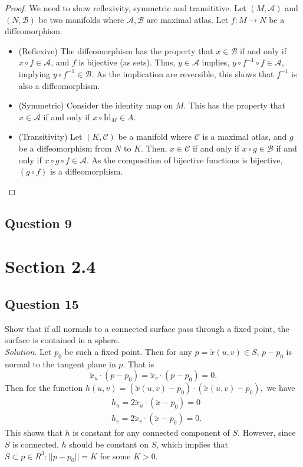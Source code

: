 \documentclass[12pt]{article}
\begin{document}
\begin{proof}
    We need to show reflexivity, symmetric and transititive.
    Let $(M, \mathscr A)$ and $(N, \mathscr B)$ be two manifolds where $\mathscr A, \mathscr B$ are
    maximal atlas. Let $f: M \to N$ be a diffeomorphism.
    \begin{itemize}
        \item (Reflexive) The diffeomorphism has the property
        that $x \in \mathscr B$ if and only if $x \circ f \in \mathscr A$,
        and $f$ is bijective (as sets). Thus, $y \in \mathscr A$ implies, $y \circ f^{-1} \circ f \in \mathscr A$,
        implying $y \circ f^{-1} \in \mathscr B$. As the implication are reversible,
        this shows that $f^{-1}$ is also a diffeomorphism.
        \item (Symmetric) Consider the identity map on $M$. This has the property
        that $x \in \mathscr A$ if and only if $x \circ \mathrm{Id}_M \in A$.
        \item (Transitivity) Let $(K, \mathscr C)$ be a manifold where $\mathscr C$ is a maximal atlas,
        and $g$ be a diffeomorphism from $N$ to $K$.
        Then, $x \in \mathscr C$ if and only if $x \circ g \in \mathscr B$ if and only if $x \circ g \circ f \in \mathscr A.$
        As the composition of bijective functions is bijective, $(g \circ f)$ is a diffeomorphism.
    \end{itemize} 
\end{proof}

\subsection*{Question 9}

\section{Section 2.4}

\subsection*{Question 15}
Show that if all normals to a connected surface pass through a fixed point, the surface is contained in a sphere.\\

\textit{Solution.} Let $p_0$ be such a fixed point. Then for any $p = \utilde{x}(u,v)\in S$, $p-p_0$ is normal to the tangent plane in $p$. That is \begin{equation*}
    \utilde{x}_u\cdot (p-p_0) = \utilde{x}_v\cdot (p-p_0) = 0.
\end{equation*}
Then for the function $h(u,v)=(\utilde{x}(u,v)-p_0)\cdot(\utilde{x}(u,v)-p_0),$ we have \begin{align*}
    &h_u = 2\utilde{x}_u\cdot (\utilde{x}-p_0) = 0\\
    &h_v = 2\utilde{x}_v\cdot (\utilde{x}-p_0) = 0.
\end{align*}
This shows that $h$ is constant for any connected component of $S$. However, since $S$ is connected, $h$ should be constant on $S$, which implies that $S\subset {p\in R^3:||p-p_0|| = K}$ for some $K>0$.
\end{document}

